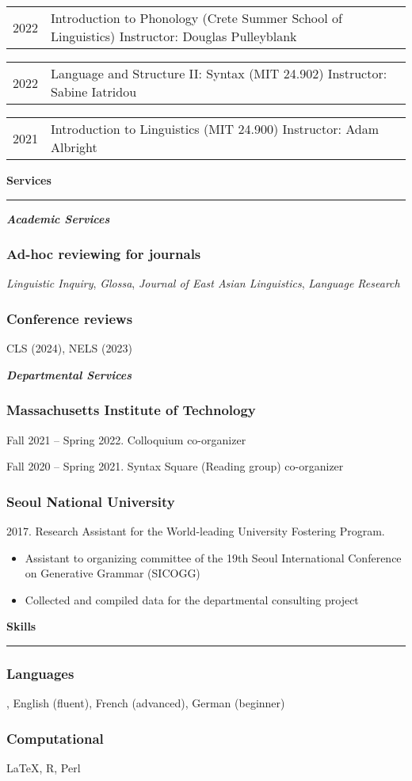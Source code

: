 \documentclass[10pt]{article}
\newcommand{\sect}[1]{\vspace{5mm} {\fontsize{14}{21}\selectfont \textbf{#1}} {\vspace{0.1cm}} \hrule {\vspace{0.3cm}}}
\newcommand{\subsect}[1]{\vspace{3mm} {\fontsize{11}{18}\selectfont \textit{\textbf{#1}}} {\vspace{0.3cm}}}
\newcommand{\paper}[2]{\begin{tabular}{p{0.1\textwidth}p{0.9\textwidth}}{#1}&{#2}\\\end{tabular}\vspace{2mm}}
\begin{document}
\paper{2022}{Introduction to Phonology (Crete Summer School of Linguistics) \newline  Instructor: Douglas Pulleyblank}

\paper{2022}{Language and Structure II: Syntax (MIT 24.902) \newline Instructor: Sabine Iatridou}

\paper{2021}{Introduction to Linguistics (MIT 24.900) \newline Instructor: Adam Albright}


\sect{Services}

\subsect{Academic Services}

\vspace{-0.75cm}

\subsubsection*{Ad-hoc reviewing for journals}

 {\textit{Linguistic Inquiry}}, {\textit{Glossa}}, {\textit{Journal of East Asian Linguistics}}, {\textit{Language Research}}

\subsubsection*{Conference reviews}

CLS (2024), NELS (2023)

\vspace{\baselineskip}

\subsect{Departmental Services}

\vspace{-0.75cm}

\subsubsection*{Massachusetts Institute of Technology}
Fall 2021 -- Spring 2022. Colloquium co-organizer

Fall 2020 -- Spring 2021. Syntax Square (Reading group) co-organizer

\subsubsection*{Seoul National University}
{2017. Research Assistant for the World-leading University Fostering Program.

\begin{itemize}[leftmargin=15pt, topsep=0pt, itemsep=0pt, parsep=0pt]
	\item{{\small Assistant to organizing committee of the 19th Seoul International Conference on Generative Grammar (SICOGG)}}
	\item{{\small Collected and compiled data for the departmental consulting project}}
\end{itemize}
}

\sect{Skills}

\subsubsection*{Languages}
, English (fluent), French (advanced), German (beginner)
\subsubsection*{Computational}
 {\LaTeX}, R, Perl
\end{document}
